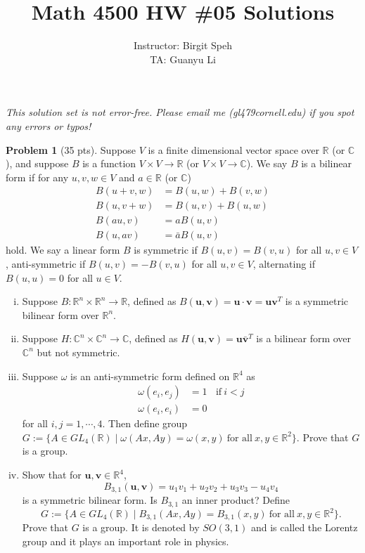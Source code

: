 \documentclass{article}
\title{Math 4500 HW \#05 Solutions}
\author{Instructor: Birgit Speh\\ TA: Guanyu Li}
\date{}
\theoremstyle{definition}
\newtheorem{problem}{Problem}
\theoremstyle{plain}
\begin{document}
\maketitle

\emph{This solution set is not error-free. Please email me (gl479\MVAt cornell.edu) if you spot any errors or typos!}

\begin{problem}[35 pts]
Suppose $V$ is a finite dimensional vector space over $\mathbb{R}$ (or $\mathbb{C}$), and suppose $B$ is a function $V\times V\to\mathbb{R}$ (or $V\times V\to\mathbb{C}$). We say $B$ is a bilinear form if for any $u,v,w\in V$ and $a\in\mathbb{R}$ (or $\mathbb{C}$)
\begin{align*}
B(u+v,w)&=B(u,w)+B(v,w)\\
B(u,v+w)&=B(u,v)+B(u,w)\\
B(au,v)&=aB(u,v)\\
B(u,av)&=\bar{a}B(u,v)
\end{align*}
hold. We say a linear form $B$ is symmetric if $B(u,v)=B(v,u)$ for all $u,v\in V$, anti-symmetric if $B(u,v)=-B(v,u)$ for all $u,v\in V$, alternating if $B(u,u)=0$ for all $u\in V$.
\begin{enumerate}[(i)]
\item Suppose $B:\mathbb{R}^n\times\mathbb{R}^n\to\mathbb{R}$, defined as $B(\bm{u},\bm{v})=\bm{u}\cdot\bm{v}=\bm{u}\bm{v}^T$ is a symmetric bilinear form over $\mathbb{R}^n$.
\item Suppose $H:\mathbb{C}^n\times\mathbb{C}^n\to\mathbb{C}$, defined as $H(\bm{u},\bm{v})=\bm{u}\bar{\bm{v}}^T$ is a bilinear form over $\mathbb{C}^n$ but not symmetric.
\item Suppose $\omega$ is an anti-symmetric form defined on $\mathbb{R}^{4}$ as
\begin{align*}
\omega(e_i,e_j)&=1~~~~\text{if}~i<j\\
\omega(e_i,e_i)&=0
\end{align*}
for all $i,j=1,\cdots,4$. Then define group $G:=\{A\in GL_4(\mathbb{R})\mid\omega(Ax,Ay)=\omega(x,y)~\text{for all}~x,y\in\mathbb{R}^2\}$. Prove that $G$ is a group.
\item Show that for $\bm{u},\bm{v}\in\mathbb{R}^{4}$,
\begin{displaymath}
B_{3,1}(\bm{u},\bm{v})=u_1v_1+u_2v_2+u_3v_3-u_4v_4
\end{displaymath}
is a symmetric bilinear form. Is $B_{3,1}$ an inner product? Define
\begin{displaymath}
G:=\{A\in GL_4(\mathbb{R})\mid B_{3,1}(Ax,Ay)=B_{3,1}(x,y)~\text{for all}~x,y\in\mathbb{R}^2\}.
\end{displaymath}
Prove that $G$ is a group. It is denoted by $SO(3,1)$ and is called the Lorentz group and it plays an important role in physics.
\end{enumerate}
\end{problem}
\end{document}
